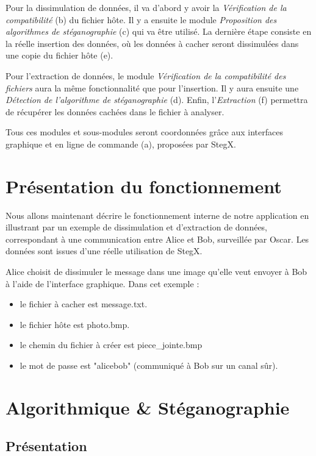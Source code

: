 \documentclass[11pt]{article}
\begin{document}
Pour la dissimulation de données, il va d'abord y avoir la \textit{Vérification 
de la compatibilité} (b) du fichier hôte. 
Il y a ensuite le module \textit{Proposition des algorithmes de stéganographie} 
(c) qui va être utilisé.
La dernière étape consiste en la réelle insertion des données, où les 
données à cacher seront dissimulées dans une copie du fichier hôte (e). 

Pour l'extraction de données, le module \textit{Vérification de la compatibilité 
des fichiers} aura la même fonctionnalité que pour l'insertion.
Il y aura ensuite une \textit{Détection de l'algorithme de stéganographie} 
(d). 
Enfin, l'\textit{Extraction} (f) permettra de récupérer les données cachées 
dans le fichier à analyser. 

Tous ces modules et sous-modules seront coordonnées grâce aux interfaces 
graphique et en ligne de commande (a), proposées par StegX. 

\section{Présentation du fonctionnement}

Nous allons maintenant décrire le fonctionnement interne de notre
application en illustrant par un exemple de dissimulation et d'extraction 
de données, correspondant à une communication entre Alice et Bob, surveillée 
par Oscar. Les données sont issues d'une réelle utilisation de StegX. 

Alice choisit de dissimuler le message dans une image qu'elle veut envoyer 
à Bob à l'aide de l'interface graphique. 
Dans cet exemple : 
\begin{itemize}
\item le fichier à cacher est message.txt. 
\item le fichier hôte est photo.bmp. 
\item le chemin du fichier à créer est piece\_jointe.bmp
\item le mot de passe est "alicebob" (communiqué à Bob sur un canal sûr).
\end{itemize}

\section{Algorithmique \& Stéganographie}

\subsection{Présentation}
\end{document}
